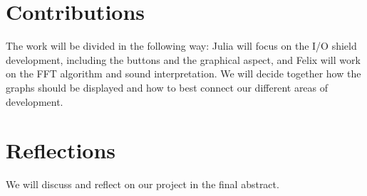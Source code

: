\documentclass[a4paper,11pt]{article}
\begin{document}
\section*{Contributions}
The work will be divided in the following way: Julia will focus on the I/O shield development, including the buttons and the graphical aspect, and Felix will work on the FFT algorithm and sound interpretation. We will decide together how the graphs should be displayed and how to best connect our different areas of development.
\section*{Reflections}
We will discuss and reflect on our project in the final abstract.
\end{document}
